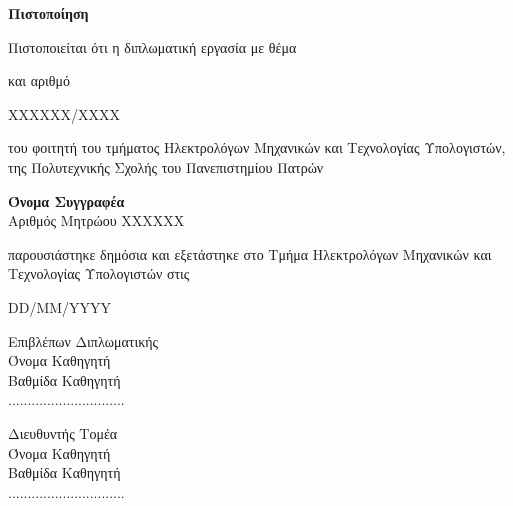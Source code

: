 \begin{otherlanguage}{greek}

\begin{center}

{\Large \textbf{Πιστοποίηση}}

\vspace{2cm}

Πιστοποιείται ότι η διπλωματική εργασία με θέμα

\vspace{1.5cm}

\HellenicThesisTitle

\vspace{1.5cm}

και αριθμό

\vspace{0.5cm}

{\large XXXXXX/XXXX}

\vspace{0.5cm}

του φοιτητή του τμήματος Ηλεκτρολόγων Μηχανικών και Τεχνολογίας Υπολογιστών, της Πολυτεχνικής Σχολής του Πανεπιστημίου Πατρών

\vspace{0.5cm}

{\large \textbf{Όνομα Συγγραφέα}}\\[0.2cm]
Αριθμός Μητρώου XXXXXX

\vspace{0.5cm}

παρουσιάστηκε δημόσια και εξετάστηκε στο Τμήμα Ηλεκτρολόγων Μηχανικών και Τεχνολογίας Υπολογιστών στις

\vspace{0.5cm}

{\large DD/MM/YYYY}

\vspace{2cm}

\begin{minipage}{0.5\textwidth}
\centering
{\large Επιβλέπων Διπλωματικής}\\[0.5cm]
Όνομα Καθηγητή\\
Βαθμίδα Καθηγητή\\[1.5cm]
..............................
\end{minipage}%
\begin{minipage}{0.5\textwidth}
\centering
{\large Διευθυντής Τομέα}\\[0.5cm]
Όνομα Καθηγητή\\
Βαθμίδα Καθηγητή\\[1.5cm]
..............................
\end{minipage}
    
\end{center}

\end{otherlanguage}
